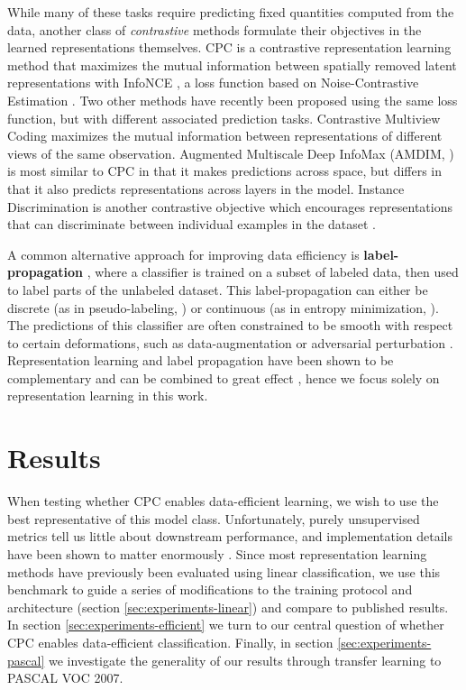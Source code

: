 \documentclass{article}
\begin{document}
While many of these tasks require predicting fixed quantities computed from the data, another class of \textit{contrastive} methods \citep{chopra2005learning, hadsell2006dimensionality} formulate their objectives in the learned representations themselves. CPC is a contrastive representation learning method that maximizes the mutual information between spatially removed latent representations with InfoNCE \citep{oord2018representation}, a loss function based on Noise-Contrastive Estimation \citep{gutmann2010noise, mnih2013learning}. Two other methods have recently been proposed using the same loss function, but with different associated prediction tasks. Contrastive Multiview Coding \citep{tian2019contrastive} maximizes the mutual information between representations of different views of the same observation. Augmented Multiscale Deep InfoMax (AMDIM, \citet{bachman2019learning}) is most similar to CPC in that it makes predictions across space, but differs in that it also predicts representations across layers in the model. Instance  Discrimination is another contrastive objective which encourages representations that can discriminate between individual examples in the dataset \citep{wu2018unsupervised}. 

A common alternative approach for improving data efficiency is \textbf{label-propagation} \citep{zhu2002labelprop}, where a classifier is trained on a subset of labeled data, then used to label parts of the unlabeled dataset. This label-propagation can either be discrete (as in pseudo-labeling, \citet{lee2013pseudo}) or continuous (as in entropy minimization, \citet{grandvalet2005semi}). The predictions of this classifier are often constrained to be smooth with respect to certain deformations, such as data-augmentation \citep{xie2019unsupervised} or adversarial perturbation \citep{miyato2018virtual}. Representation learning and label propagation have been shown to be complementary and can be combined to great effect \citep{zhai2019s}, hence we focus solely on representation learning in this work.

\section{Results}
\label{sec:experiments}

When testing whether CPC enables data-efficient learning, we wish to use the best representative of this model class. Unfortunately, purely unsupervised metrics tell us little about downstream performance, and implementation details have been shown to matter enormously \citep{doersch2017multi, kolesnikov2019revisiting}. Since most representation learning methods have previously been evaluated using linear classification, we use this benchmark to guide a series of modifications to the training protocol and architecture (section \ref{sec:experiments-linear}) and compare to published results. In section \ref{sec:experiments-efficient} we turn to our central question of whether CPC enables data-efficient classification. Finally, in section \ref{sec:experiments-pascal} we investigate the generality of our results through transfer learning to PASCAL VOC 2007.
\end{document}
